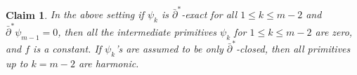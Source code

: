 \documentclass[11pt,letterpaper]{amsart}
\newcommand{\sbpartial}{\bar{\partial}^*}
\newtheorem{claim}{Claim}[section]
\numberwithin{equation}{section}
\begin{document}
\






\begin{claim}\label{harmonicity-claim}
    In the above setting if $\psi_k$ is $\sbpartial$-exact for all $1 \leq k \leq m-2 $ and $\sbpartial \psi_{m-1} = 0$, then all the intermediate primitives $\psi_{k}$ for $1 \leq k \leq m-2$ are zero, and $f$ is a constant. If $\psi_k$'s are assumed to be only $\sbpartial$-closed, then all primitives up to $k=m-2$ are harmonic.
\end{claim}




\










    
\end{document}
